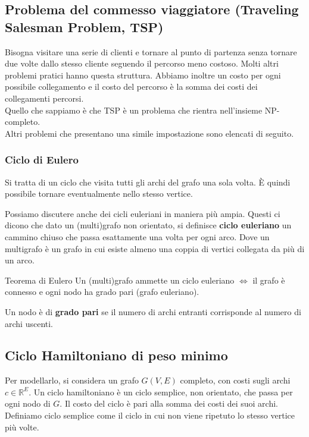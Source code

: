 \subsection{Problema del commesso viaggiatore (Traveling Salesman Problem, TSP)}

Bisogna visitare una serie di clienti e tornare al punto di partenza senza tornare due volte dallo stesso cliente seguendo il percorso meno costoso. Molti altri problemi pratici hanno questa struttura. Abbiamo inoltre un costo per ogni possibile collegamento e il costo del percorso è la somma dei costi dei collegamenti percorsi.\\
Quello che sappiamo è che TSP è un problema che rientra nell'insieme NP-completo.\\
Altri problemi che presentano una simile impostazione sono elencati di seguito.
\subsubsection{Ciclo di Eulero}
Si tratta di un ciclo che visita tutti gli archi del grafo una sola volta. È quindi possibile tornare eventualmente nello stesso vertice.

Possiamo discutere anche dei cicli euleriani in maniera più ampia. Questi ci dicono che dato un (multi)grafo non orientato, si definisce\textbf{ ciclo euleriano }un cammino chiuso che passa esattamente una volta per ogni arco. Dove un multigrafo è un grafo in cui esiste almeno una coppia di vertici collegata da più di un arco.
\begin{teorema}{Teorema di Eulero}{}
    Un (multi)grafo ammette un ciclo euleriano $\iff$ il grafo è connesso e ogni nodo ha grado pari (grafo euleriano).
\end{teorema}

Un nodo è di \textbf{grado pari} se il numero di archi entranti corrisponde al numero di archi uscenti.

\subsection{Ciclo Hamiltoniano di peso minimo}
Per modellarlo, si considera un grafo $G(V,E)$ completo, con costi sugli archi $c \in \mathbb{R}^E$. Un ciclo hamiltoniano è un ciclo semplice, non orientato, che passa per ogni nodo di $G$. Il costo del ciclo è pari alla somma dei costi dei suoi archi.\\
Definiamo ciclo semplice come il ciclo in cui non viene ripetuto lo stesso vertice più volte.\\

